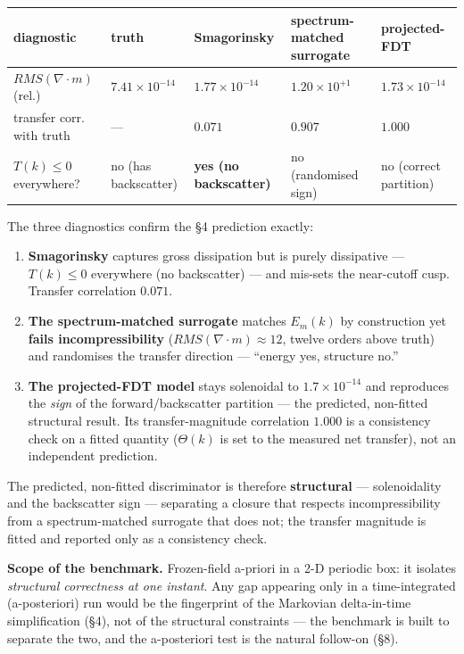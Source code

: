 \documentclass[aps,prfluids,preprint,superscriptaddress,nofootinbib]{revtex4-2}
\begin{document}
\begin{center}\small
\begin{tabularx}{\linewidth}{>{\raggedright\arraybackslash}X>{\raggedright\arraybackslash}X>{\raggedright\arraybackslash}X>{\raggedright\arraybackslash}X>{\raggedright\arraybackslash}X}
\toprule
diagnostic & truth & Smagorinsky & spectrum-matched surrogate & projected-FDT \\
\midrule
$RMS(\nabla \cdot m)$ (rel.) & $7.41\times 10^{-14}$ & $1.77\times 10^{-14}$ & \textbf{$1.20\times 10^{+1}$} & $1.73\times 10^{-14}$ \\
transfer corr. with truth & — & \textbf{$0.071$} & $0.907$ & \textbf{$1.000$} \\
$T(k)\le 0$ everywhere? & no (has backscatter) & \textbf{yes (no backscatter)} & no (randomised sign) & no (correct partition) \\
\bottomrule
\end{tabularx}
\end{center}

The three diagnostics confirm the §4 prediction exactly:

\begin{enumerate}
\item \textbf{Smagorinsky} captures gross dissipation but is purely dissipative — $T(k)\le 0$ everywhere (no backscatter) — and mis-sets the near-cutoff cusp. Transfer correlation $0.071$.
\item \textbf{The spectrum-matched surrogate} matches $E_{m}(k)$ by construction yet \textbf{fails incompressibility} ($RMS(\nabla \cdot m)\approx 12$, twelve orders above truth) and randomises the transfer direction — ``energy yes, structure no.''
\item \textbf{The projected-FDT model} stays solenoidal to $1.7\times 10^{-14}$ and reproduces the \emph{sign} of the forward/backscatter partition — the predicted, non-fitted structural result. Its transfer-magnitude correlation $1.000$ is a consistency check on a fitted quantity ($\Theta (k)$ is set to the measured net transfer), not an independent prediction.
\end{enumerate}

The predicted, non-fitted discriminator is therefore \textbf{structural} — solenoidality and the backscatter sign — separating a closure that respects incompressibility from a spectrum-matched surrogate that does not; the transfer magnitude is fitted and reported only as a consistency check.

\textbf{Scope of the benchmark.} Frozen-field a-priori in a 2-D periodic box: it isolates \emph{structural correctness at one instant}. Any gap appearing only in a time-integrated (a-posteriori) run would be the fingerprint of the Markovian delta-in-time simplification (§4), not of the structural constraints — the benchmark is built to separate the two, and the a-posteriori test is the natural follow-on (§8).
\end{document}
